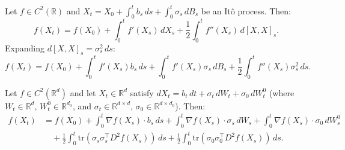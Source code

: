 \begin{theorem}
Let $f \in C^2(\mathbb{R})$ and $X_t = X_0 + \int_0^t b_s\, ds + \int_0^t \sigma_s\, dB_s$
be an It\^o process. Then:
\[
    f(X_t) = f(X_0) + \int_0^t f'(X_s)\, dX_s + \frac{1}{2}\int_0^t f''(X_s)\, d[X,X]_s.
\]
Expanding $d[X,X]_s = \sigma_s^2\, ds$:
\begin{equation}
    f(X_t) = f(X_0) + \int_0^t f'(X_s) b_s\, ds + \int_0^t f'(X_s) \sigma_s\, dB_s +
    \frac{1}{2}\int_0^t f''(X_s) \sigma_s^2\, ds.
    \label{eq:ito-formula-1d}
\end{equation}
\end{theorem}

\begin{theorem}
\label{thm:ito-multidim}
Let $f \in C^2(\mathbb{R}^d)$ and let $X_t \in \mathbb{R}^d$ satisfy
$dX_t = b_t\, dt + \sigma_t\, dW_t + \sigma_0\, dW_t^0$ (where $W_t \in \mathbb{R}^d$,
$W_t^0 \in \mathbb{R}^{d_0}$, and $\sigma_t \in \mathbb{R}^{d \times d}$,
$\sigma_0 \in \mathbb{R}^{d \times d_0}$). Then:
\begin{align*}
    f(X_t) &= f(X_0) + \int_0^t \nabla f(X_s) \cdot b_s\, ds + \int_0^t \nabla f(X_s)
        \cdot \sigma_s\, dW_s + \int_0^t \nabla f(X_s) \cdot \sigma_0\, dW_s^0 \\
    &\quad + \frac{1}{2}\int_0^t \mathrm{tr}(\sigma_s \sigma_s^\top D^2 f(X_s))\, ds +
        \frac{1}{2}\int_0^t \mathrm{tr}(\sigma_0 \sigma_0^\top D^2 f(X_s))\, ds.
\end{align*}
\end{theorem}

